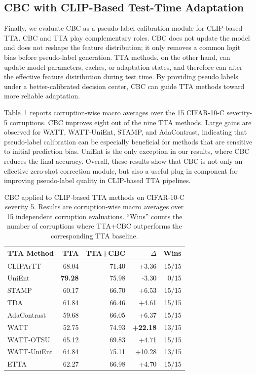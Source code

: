 \subsection{CBC with CLIP-Based Test-Time Adaptation}
\label{subsec:tta}

Finally, we evaluate CBC as a pseudo-label calibration module for CLIP-based TTA.
CBC and TTA play complementary roles.
CBC does not update the model and does not reshape the feature distribution; it only removes a common logit bias before pseudo-label generation.
TTA methods, on the other hand, can update model parameters, caches, or adaptation states, and therefore can alter the effective feature distribution during test time.
By providing pseudo labels under a better-calibrated decision center, CBC can guide TTA methods toward more reliable adaptation.

Table~\ref{tab:tta} reports corruption-wise macro averages over the 15 CIFAR-10-C severity-5 corruptions.
CBC improves eight out of the nine TTA methods.
Large gains are observed for WATT, WATT-UniEnt, STAMP, and AdaContrast, indicating that pseudo-label calibration can be especially beneficial for methods that are sensitive to initial prediction bias.
UniEnt is the only exception in our results, where CBC reduces the final accuracy.
Overall, these results show that CBC is not only an effective zero-shot correction module, but also a useful plug-in component for improving pseudo-label quality in CLIP-based TTA pipelines.

\begin{table}[t]
\centering
\caption{CBC applied to CLIP-based TTA methods on CIFAR-10-C severity 5. Results are corruption-wise macro averages over 15 independent corruption evaluations. ``Wins'' counts the number of corruptions where TTA+CBC outperforms the corresponding TTA baseline.}
\label{tab:tta}
\small
\setlength{\tabcolsep}{4pt}
\begin{tabular}{lrrrr}
\toprule
\textbf{TTA Method} & \textbf{TTA} & \textbf{TTA+CBC} & \textbf{$\Delta$} & \textbf{Wins} \\
\midrule
CLIPArTT & 68.04 & 71.40 & +3.36 & 15/15 \\
UniEnt & \textbf{79.28} & 75.98 & -3.30 & 0/15 \\
STAMP & 60.17 & 66.70 & +6.53 & 15/15 \\
TDA & 61.84 & 66.46 & +4.61 & 15/15 \\
AdaContrast & 59.68 & 66.05 & +6.37 & 15/15 \\
WATT & 52.75 & 74.93 & \textbf{+22.18} & 13/15 \\
WATT-OTSU & 65.12 & 69.83 & +4.71 & 15/15 \\
WATT-UniEnt & 64.84 & 75.11 & +10.28 & 13/15 \\
ETTA & 62.27 & 66.98 & +4.70 & 15/15 \\
\bottomrule
\end{tabular}
\end{table}

